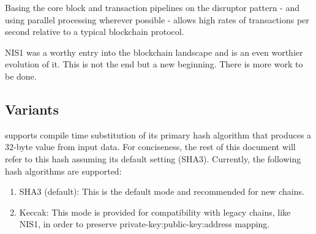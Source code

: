 Basing the core block and transaction pipelines on the disruptor pattern - and using parallel processing wherever possible - allows high rates of transactions per second relative to a typical blockchain protocol.

NIS1 was a worthy entry into the blockchain landscape and \codenamespace is an even worthier evolution of it.
This is not the end but a new beginning.
There is more work to be done.

\subsection{Variants}

\codenamespace supports compile time substitution of its primary hash algorithm that produces a 32-byte value from input data.
For conciseness, the rest of this document will refer to this hash assuming its default setting (SHA3).
Currently, the following hash algorithms are supported:

\begin{enumerate}
\item SHA3 (default): This is the default mode and recommended for new chains.
\item Keccak: This mode is provided for compatibility with legacy chains, like NIS1, in order to preserve private-key:public-key:address mapping.
\end{enumerate}

